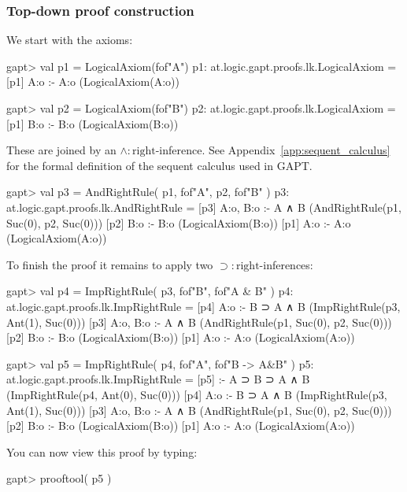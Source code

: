 \documentclass[a4paper,11pt]{article}
\newcommand{\impl}{\supset} %
\renewcommand{\land}{\wedge}
\begin{document}
\subsubsection{Top-down proof construction}
We start with the axioms:
%
\begin{clilisting}
gapt> val p1 = LogicalAxiom(fof"A")
p1: at.logic.gapt.proofs.lk.LogicalAxiom =
[p1] A:o :- A:o    (LogicalAxiom(A:o))

gapt> val p2 = LogicalAxiom(fof"B")
p2: at.logic.gapt.proofs.lk.LogicalAxiom =
[p1] B:o :- B:o    (LogicalAxiom(B:o))

\end{clilisting}
%
These are joined by an $\land:\mathrm{right}$-inference. See Appendix~\ref{app:sequent_calculus}
for the formal definition of the sequent calculus used in GAPT.
\begin{clilisting}
gapt> val p3 = AndRightRule( p1, fof"A", p2, fof"B" )
p3: at.logic.gapt.proofs.lk.AndRightRule =
[p3] A:o, B:o :- A ∧ B    (AndRightRule(p1, Suc(0), p2, Suc(0)))
[p2] B:o :- B:o    (LogicalAxiom(B:o))
[p1] A:o :- A:o    (LogicalAxiom(A:o))

\end{clilisting}
%
To finish the proof it remains to apply two $\impl:\mathrm{right}$-inferences:
%
\begin{clilisting}
gapt> val p4 = ImpRightRule( p3, fof"B", fof"A & B" )
p4: at.logic.gapt.proofs.lk.ImpRightRule =
[p4] A:o :- B ⊃ A ∧ B    (ImpRightRule(p3, Ant(1), Suc(0)))
[p3] A:o, B:o :- A ∧ B    (AndRightRule(p1, Suc(0), p2, Suc(0)))
[p2] B:o :- B:o    (LogicalAxiom(B:o))
[p1] A:o :- A:o    (LogicalAxiom(A:o))

gapt> val p5 = ImpRightRule( p4, fof"A", fof"B -> A&B" )
p5: at.logic.gapt.proofs.lk.ImpRightRule =
[p5]  :- A ⊃ B ⊃ A ∧ B    (ImpRightRule(p4, Ant(0), Suc(0)))
[p4] A:o :- B ⊃ A ∧ B    (ImpRightRule(p3, Ant(1), Suc(0)))
[p3] A:o, B:o :- A ∧ B    (AndRightRule(p1, Suc(0), p2, Suc(0)))
[p2] B:o :- B:o    (LogicalAxiom(B:o))
[p1] A:o :- A:o    (LogicalAxiom(A:o))

\end{clilisting}
%
You can now view this proof by typing:
\begin{clilisting}
gapt> prooftool( p5 )

\end{clilisting}
\end{document}
